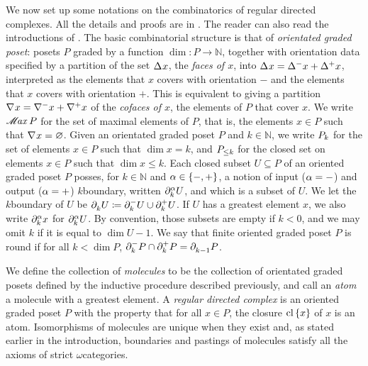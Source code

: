 We now set up some notations on the combinatorics of regular directed complexes.
All the details and proofs are in \cite{hadzihasanovic2024combinatorics}.
The reader can also read the introductions of \cite{chanavat2024htpy, chanavat2024equivalences, chanavat2024model}.
The basic combinatorial structure is that of \emph{orientated graded poset}: posets \( P \) graded by a function \( \dim \colon P \to \mathbb{N} \), together with orientation data specified by a partition of the set \( \faces{}{} x \), the \emph{faces of \( x \)}, into \( \faces{}{} x = \faces{}{-} x + \faces{}{+} x \), interpreted as the elements that \( x \) covers with orientation \( - \) and the elements that \( x \) covers with orientation \( + \). 
This is equivalent to giving a partition \( \cofaces{}{} x = \cofaces{}{-} x + \cofaces{}{+} x \) of the \emph{cofaces of \( x \)}, the elements of \( P \) that cover \( x \).
We write \( \maxel{P} \) for the set of maximal elements of \( P \), that is, the elements \( x \in P \) such that \( \cofaces{}{} x = \varnothing \).
Given an orientated graded poset \( P \) and \( k \in \mathbb{N} \), we write \( \gr{k}{P} \) for the set of elements \( x \in P \) such that \( \dim x = k \), and \( \gr{\le k}{P} \) for the closed set on elements \( x \in P \) such that \( \dim x \le k \). 
Each closed subset \( U \subseteq P \) of an oriented graded poset \( P \) posses, for \( k \in \mathbb{N} \) and \( \a \in \set{-, +} \), a notion of input (\( \a = - \)) and output (\( \a = + \)) \( k \)\nbd boundary, written \( \bd{k}{\a} U \), and which is a subset of \( U \). 
We let the \( k \)\nbd boundary of \( U \) be \( \bd{k}{} U \eqdef \bd{k}{-} U \cup \bd{k}{+} U \).
If \( U \) has a greatest element \( x \), we also write \( \bd{k}{\a} x \) for \( \bd{k}{\a} U \).
By convention, those subsets are empty if \( k < 0 \), and we may omit \( k \) if it is equal to \( \dim U - 1 \).
We say that finite oriented graded poset \( P \) is round if for all \( k < \dim P  \), \( \bd{k}{-} P \cap \bd{k}{+} P = \bd{k - 1}{} P \).

We define the collection of \emph{molecules} to be the collection of orientated graded posets defined by the inductive procedure described previously, and call an \emph{atom} a molecule with a greatest element.
A \emph{regular directed complex} is an oriented graded poset \( P \) with the property that for all \( x \in P \), the closure \( \clset{x} \) of \( x \) is an atom.
Isomorphisms of molecules are unique when they exist and, as stated earlier in the introduction, boundaries and pastings of molecules satisfy all the axioms of strict \( \omega \)\nbd categories.

